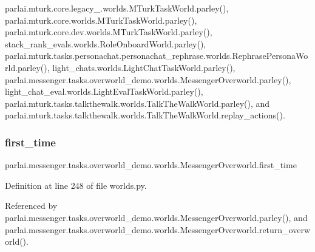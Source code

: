 parlai.\+mturk.\+core.\+legacy\+\_.\+worlds.\+M\+Turk\+Task\+World.\+parley(), parlai.\+mturk.\+core.\+worlds.\+M\+Turk\+Task\+World.\+parley(), parlai.\+mturk.\+core.\+dev.\+worlds.\+M\+Turk\+Task\+World.\+parley(), stack\+\_\+rank\+\_\+evals.\+worlds.\+Role\+Onboard\+World.\+parley(), parlai.\+mturk.\+tasks.\+personachat.\+personachat\+\_\+rephrase.\+worlds.\+Rephrase\+Persona\+World.\+parley(), light\+\_\+chats.\+worlds.\+Light\+Chat\+Task\+World.\+parley(), parlai.\+messenger.\+tasks.\+overworld\+\_\+demo.\+worlds.\+Messenger\+Overworld.\+parley(), light\+\_\+chat\+\_\+eval.\+worlds.\+Light\+Eval\+Task\+World.\+parley(), parlai.\+mturk.\+tasks.\+talkthewalk.\+worlds.\+Talk\+The\+Walk\+World.\+parley(), and parlai.\+mturk.\+tasks.\+talkthewalk.\+worlds.\+Talk\+The\+Walk\+World.\+replay\+\_\+actions().

\mbox{\label{classparlai_1_1messenger_1_1tasks_1_1overworld__demo_1_1worlds_1_1MessengerOverworld_acb7af295e8d25f31e3c97a9a23856cdf}} 
\subsubsection{\texorpdfstring{first\+\_\+time}{first\_time}}
{\footnotesize\ttfamily parlai.\+messenger.\+tasks.\+overworld\+\_\+demo.\+worlds.\+Messenger\+Overworld.\+first\+\_\+time}



Definition at line 248 of file worlds.\+py.



Referenced by parlai.\+messenger.\+tasks.\+overworld\+\_\+demo.\+worlds.\+Messenger\+Overworld.\+parley(), and parlai.\+messenger.\+tasks.\+overworld\+\_\+demo.\+worlds.\+Messenger\+Overworld.\+return\+\_\+overworld().

\mbox{\label{classparlai_1_1messenger_1_1tasks_1_1overworld__demo_1_1worlds_1_1MessengerOverworld_aaff57f24d0e72c7400f6edd1aa374875}} 
